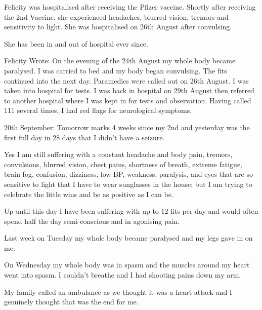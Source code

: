 Felicity was hospitalised after receiving the Pfizer vaccine. Shortly after
receiving the 2nd Vaccine, she experienced headaches, blurred vision, tremors
and sensitivity to light. She was hospitalised on 26th August after convulsing.

She has been in and out of hospital ever since.

Felicity Wrote: On the evening of the 24th August my whole body became
paralysed. I was carried to bed and my body began convulsing. The fits continued
into the next day. Paramedics were called out on 26th August. I was taken into
hospital for tests. I was back in hospital on 29th August then referred to
another hospital where I was kept in for tests and observation. Having called
111 several times, I had red flags for neurological symptoms.

20th September: Tomorrow marks 4 weeks since my 2nd and yesterday was the first
full day in 28 days that I didn’t have a seizure.

Yes I am still suffering with a constant headache and body pain, tremors,
convulsions, blurred vision, chest pains, shortness of breath, extreme fatigue,
brain fog, confusion, dizziness, low BP, weakness, paralysis, and eyes that are
so sensitive to light that I have to wear sunglasses in the house; but I am
trying to celebrate the little wins and be as positive as I can be.

Up until this day I have been suffering with up to 12 fits per day and would
often spend half the day semi-conscious and in agonising pain.

Last week on Tuesday my whole body became paralysed and my legs gave in on me.

On Wednesday my whole body was in spasm and the muscles around my heart went
into spasm. I couldn’t breathe and I had shooting pains down my arm.

My family called an ambulance as we thought it was a heart attack and I
genuinely thought that was the end for me.

